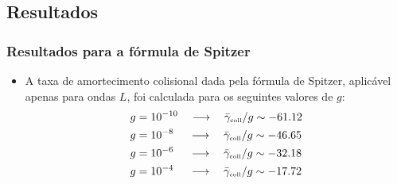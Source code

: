 \documentclass[10pt,aspectratio=1610,lualatex]{beamer}
\begin{document}

\subsection*{Resultados}
\begin{frame}
  \frametitle{Resultados para a fórmula de Spitzer}
  \begin{itemize}
    \item A taxa de amortecimento colisional dada pela fórmula de
    Spitzer, aplicável apenas para ondas $L$, foi calculada para os
    seguintes  valores de $g$:
    \begin{align*}
      g&=10^{-10}\quad \longrightarrow \quad
      \bar \gamma_{\mbox{\tiny coll}}/g \sim -61.12\\
      g&=10^{-8}\,\,\quad \longrightarrow \quad
      \bar \gamma_{\mbox{\tiny coll}}/g \sim -46.65\\
      g&=10^{-6}\,\,\quad \longrightarrow \quad
      \bar \gamma_{\mbox{\tiny coll}}/g \sim -32.18\\
      g&=10^{-4}\,\,\quad \longrightarrow \quad
      \bar \gamma_{\mbox{\tiny coll}}/g \sim -17.72\\
    \end{align*}
  \end{itemize}
\end{frame}
\end{document}
